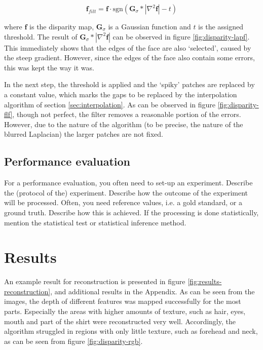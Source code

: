 \documentclass[journal]{IEEEtran}
\newcommand{\gray}[1]{\color{gray}#1\color{black}}
\begin{document}
\begin{equation}
    \mathbf{f}_{filt} = \mathbf{f} \cdot \mathrm{sgn}\!\left(\mathbf{G}_\sigma * |\nabla^2\mathbf{f}| - t\right)
\end{equation}

where $ \mathbf{f} $ is the disparity map, $ \mathbf{G}_\sigma $ is a Gaussian function and $ t $ is the assigned threshold. The result of $ \mathbf{G}_\sigma * |\nabla^2\mathbf{f}| $ can be observed in figure \ref{fig:disparity-lapf}. This immediately shows that the edges of the face are also `selected', caused by the steep gradient. However, since the edges of the face also contain some errors, this was kept the way it was.

In the next step, the threshold is applied and the `spiky' patches are replaced by a constant value, which marks the gaps to be replaced by the interpolation algorithm of section \ref{sec:interpolation}. As can be observed in figure \ref{fig:disparity-flf}, though not perfect, the filter removes a reasonable portion of the errors. However, due to the nature of the algorithm (to be precise, the nature of the blurred Laplacian) the larger patches are not fixed.

\subsection{Performance evaluation}
\gray{For a performance evaluation, you often need to set-up an experiment. Describe the (protocol of the) experiment. Describe how the outcome of the experiment will be processed. Often, you need reference values, i.e. a gold standard, or a ground truth. Describe how this is achieved. If the processing is done statistically, mention the statistical test or statistical inference method.}


\section{Results}

An example result for reconstruction is presented in figure \ref{fig:results-reconstruction}, and additional results in the Appendix.
As can be seen from the images, the depth of different features was mapped successfully for the most parts.
Especially the areas with higher amounts of texture, such as hair, eyes, mouth and part of the shirt were reconstructed very well. 
Accordingly, the algorithm struggled in regions with only little texture, such as forehead and neck, as can be seen from figure \ref{fig:disparity-rgb}.
\end{document}
